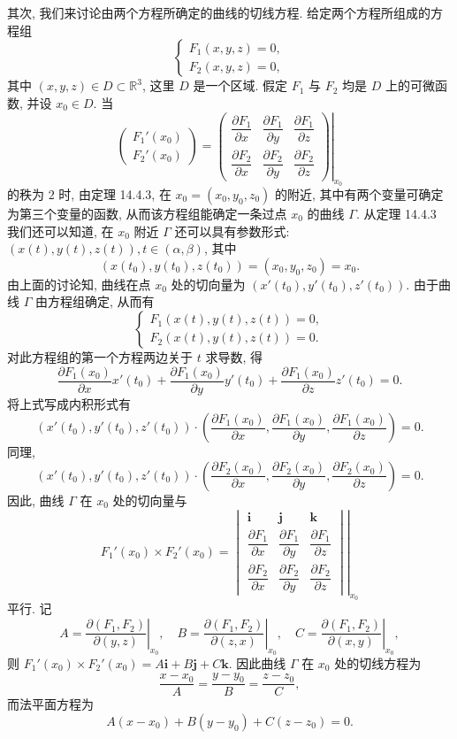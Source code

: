\documentclass[UTF8,12pt,a4paper,fontset=fandol]{ctexart}
\begin{document}
其次, 我们来讨论由两个方程所确定的曲线的切线方程. 给定两个方程所组成的方程组
\[
  \begin{cases}
    F_1(x,y,z)=0,\\
    F_2(x,y,z)=0,
  \end{cases}
\]
其中 $(x,y,z)\in D\subset\mathbb R^3$, 这里 $D$ 是一个区域. 假定 $F_1$ 与 $F_2$ 均是 $D$ 上的可微函数, 并设 $x_0\in D$. 当
\[
  \begin{pmatrix}
    F_1'(x_0)\\
    F_2'(x_0)
  \end{pmatrix}
  =
  \left.
  \begin{pmatrix}
    \dfrac{\partial F_1}{\partial x} & \dfrac{\partial F_1}{\partial y} & \dfrac{\partial F_1}{\partial z}\\
    \dfrac{\partial F_2}{\partial x} & \dfrac{\partial F_2}{\partial y} & \dfrac{\partial F_2}{\partial z}
  \end{pmatrix}
  \right|_{x_0}
\]
的秩为 $2$ 时, 由定理 14.4.3, 在 $x_0=(x_0,y_0,z_0)$ 的附近, 其中有两个变量可确定为第三个变量的函数, 从而该方程组能确定一条过点 $x_0$ 的曲线 $\Gamma$. 从定理 14.4.3 我们还可以知道, 在 $x_0$ 附近 $\Gamma$ 还可以具有参数形式: $(x(t),y(t),z(t)),t\in(\alpha,\beta)$, 其中
\[
  (x(t_0),y(t_0),z(t_0))=(x_0,y_0,z_0)=x_0.
\]
由上面的讨论知, 曲线在点 $x_0$ 处的切向量为 $(x'(t_0),y'(t_0),z'(t_0))$. 由于曲线 $\Gamma$ 由方程组确定, 从而有
\[
  \begin{cases}
    F_1(x(t),y(t),z(t))=0,\\
    F_2(x(t),y(t),z(t))=0.
  \end{cases}
\]
对此方程组的第一个方程两边关于 $t$ 求导数, 得
\[
  \frac{\partial F_1(x_0)}{\partial x}x'(t_0)
  +
  \frac{\partial F_1(x_0)}{\partial y}y'(t_0)
  +
  \frac{\partial F_1(x_0)}{\partial z}z'(t_0)
  =0.
\]
将上式写成内积形式有
\[
  (x'(t_0),y'(t_0),z'(t_0))\cdot
  \left(
    \frac{\partial F_1(x_0)}{\partial x},
    \frac{\partial F_1(x_0)}{\partial y},
    \frac{\partial F_1(x_0)}{\partial z}
  \right)
  =0.
\]
同理,
\[
  (x'(t_0),y'(t_0),z'(t_0))\cdot
  \left(
    \frac{\partial F_2(x_0)}{\partial x},
    \frac{\partial F_2(x_0)}{\partial y},
    \frac{\partial F_2(x_0)}{\partial z}
  \right)
  =0.
\]
因此, 曲线 $\Gamma$ 在 $x_0$ 处的切向量与
\[
  F_1'(x_0)\times F_2'(x_0)
  =
  \left.
  \begin{vmatrix}
    \mathbf i & \mathbf j & \mathbf k\\
    \dfrac{\partial F_1}{\partial x} & \dfrac{\partial F_1}{\partial y} & \dfrac{\partial F_1}{\partial z}\\
    \dfrac{\partial F_2}{\partial x} & \dfrac{\partial F_2}{\partial y} & \dfrac{\partial F_2}{\partial z}
  \end{vmatrix}
  \right|_{x_0}
\]
平行. 记
\[
  A=\left.\frac{\partial(F_1,F_2)}{\partial(y,z)}\right|_{x_0},\quad
  B=\left.\frac{\partial(F_1,F_2)}{\partial(z,x)}\right|_{x_0},\quad
  C=\left.\frac{\partial(F_1,F_2)}{\partial(x,y)}\right|_{x_0},
\]
则 $F_1'(x_0)\times F_2'(x_0)=A\mathbf i+B\mathbf j+C\mathbf k$. 因此曲线 $\Gamma$ 在 $x_0$ 处的切线方程为
\[
  \frac{x-x_0}{A}=\frac{y-y_0}{B}=\frac{z-z_0}{C},
\]
而法平面方程为
\[
  A(x-x_0)+B(y-y_0)+C(z-z_0)=0.
\]
\end{document}
